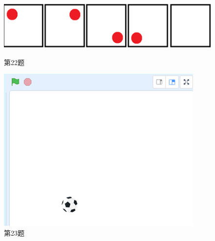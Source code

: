 \documentclass[10pt, a4paper]{article}
\begin{document}
\begin{enumerate}
        \begin{figure}[htbp]
            \centering
            \begin{minipage}[t]{.3\textwidth}
                \centering
                \includegraphics[width=\textwidth]{22.png}
                \caption*{第22题}
            \end{minipage}
            \begin{minipage}[t]{.25\textwidth}
                \centering
                \includegraphics[width=\textwidth]{23.png}
                \caption*{第23题}
            \end{minipage}
            \begin{minipage}[t]{.18\textwidth}
                \centering

\end{minipage}
\end{figure}
\end{enumerate}
\end{document}
